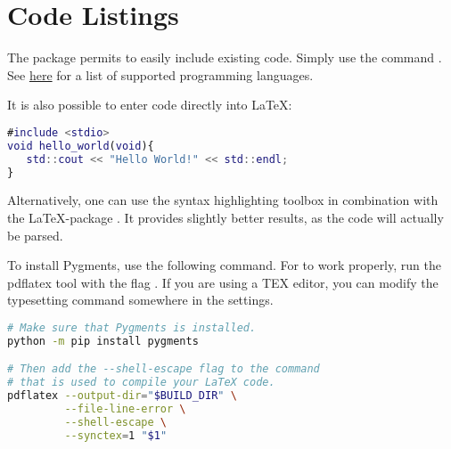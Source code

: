 

\chapter{Code Listings}

\label{Code Listings} %


The package \href{https://www.overleaf.com/learn/latex/Code\_listing}{} permits to easily include existing code. Simply use the command \verb||. See \href{https://www.overleaf.com/learn/latex/Code\_listing#Supported\_languages}{here} for a list of supported programming languages.




It is also possible to enter code directly into \LaTeX:

\begin{lstlisting}[language=Matlab]
#include <stdio>
void hello_world(void){
   std::cout << "Hello World!" << std::endl;
}    
\end{lstlisting}

Alternatively, one can use the syntax highlighting toolbox \href{https://pygments.org/}{} in combination with the \LaTeX-package \href{www.overleaf.com/learn/latex/Code\_Highlighting\_with\_minted}{}. It provides slightly better results, as the code will actually be parsed.

To install Pygments, use the following command. For  to work properly, run the pdflatex tool with the flag . If you are using a TEX editor, you can modify the typesetting   command somewhere in the settings.

\begin{lstlisting}[language=bash]
# Make sure that Pygments is installed.
python -m pip install pygments

# Then add the --shell-escape flag to the command 
# that is used to compile your LaTeX code.
pdflatex --output-dir="$BUILD_DIR" \
         --file-line-error \
         --shell-escape \
         --synctex=1 "$1"
\end{lstlisting}



